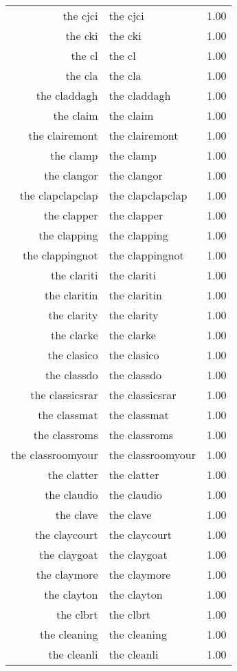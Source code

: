 \begin{table}[ht]
\begin{tabular}{rlr}
  the cjci & the cjci & 1.00 \\ 
  the cki & the cki & 1.00 \\ 
  the cl & the cl & 1.00 \\ 
  the cla & the cla & 1.00 \\ 
  the claddagh & the claddagh & 1.00 \\ 
  the claim & the claim & 1.00 \\ 
  the clairemont & the clairemont & 1.00 \\ 
  the clamp & the clamp & 1.00 \\ 
  the clangor & the clangor & 1.00 \\ 
  the clapclapclap & the clapclapclap & 1.00 \\ 
  the clapper & the clapper & 1.00 \\ 
  the clapping & the clapping & 1.00 \\ 
  the clappingnot & the clappingnot & 1.00 \\ 
  the clariti & the clariti & 1.00 \\ 
  the claritin & the claritin & 1.00 \\ 
  the clarity & the clarity & 1.00 \\ 
  the clarke & the clarke & 1.00 \\ 
  the clasico & the clasico & 1.00 \\ 
  the classdo & the classdo & 1.00 \\ 
  the classicsrar & the classicsrar & 1.00 \\ 
  the classmat & the classmat & 1.00 \\ 
  the classroms & the classroms & 1.00 \\ 
  the classroomyour & the classroomyour & 1.00 \\ 
  the clatter & the clatter & 1.00 \\ 
  the claudio & the claudio & 1.00 \\ 
  the clave & the clave & 1.00 \\ 
  the claycourt & the claycourt & 1.00 \\ 
  the claygoat & the claygoat & 1.00 \\ 
  the claymore & the claymore & 1.00 \\ 
  the clayton & the clayton & 1.00 \\ 
  the clbrt & the clbrt & 1.00 \\ 
  the cleaning & the cleaning & 1.00 \\ 
  the cleanli & the cleanli & 1.00 \\ 

\end{tabular}
\end{table}
